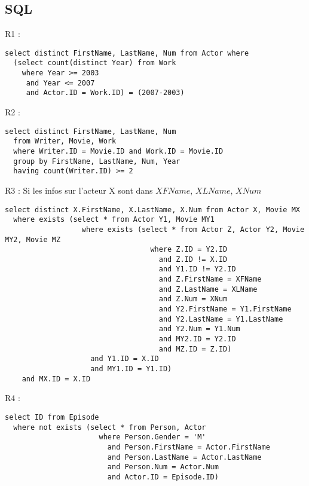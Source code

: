 \documentclass[a4paper,12pt]{article}
\begin{document}
\subsection{SQL}
\begin{list}{-}{}
  \item R1 :
    \begin{lstlisting}
select distinct FirstName, LastName, Num from Actor where
  (select count(distinct Year) from Work
    where Year >= 2003
     and Year <= 2007
     and Actor.ID = Work.ID) = (2007-2003)
    \end{lstlisting}
  \item R2 :
    \begin{lstlisting}
select distinct FirstName, LastName, Num
  from Writer, Movie, Work
  where Writer.ID = Movie.ID and Work.ID = Movie.ID
  group by FirstName, LastName, Num, Year
  having count(Writer.ID) >= 2
    \end{lstlisting}
  \item R3 :
    Si les infos sur l'acteur X sont dans $XFName$, $XLName$, $XNum$
    \begin{lstlisting}
select distinct X.FirstName, X.LastName, X.Num from Actor X, Movie MX
  where exists (select * from Actor Y1, Movie MY1
                  where exists (select * from Actor Z, Actor Y2, Movie MY2, Movie MZ
                                  where Z.ID = Y2.ID
                                    and Z.ID != X.ID
                                    and Y1.ID != Y2.ID
                                    and Z.FirstName = XFName
                                    and Z.LastName = XLName
                                    and Z.Num = XNum
                                    and Y2.FirstName = Y1.FirstName
                                    and Y2.LastName = Y1.LastName
                                    and Y2.Num = Y1.Num
                                    and MY2.ID = Y2.ID
                                    and MZ.ID = Z.ID)
                    and Y1.ID = X.ID
                    and MY1.ID = Y1.ID)
    and MX.ID = X.ID
    \end{lstlisting}
  \item R4 :
    \begin{lstlisting}
select ID from Episode
  where not exists (select * from Person, Actor
                      where Person.Gender = 'M'
                        and Person.FirstName = Actor.FirstName
                        and Person.LastName = Actor.LastName
                        and Person.Num = Actor.Num
                        and Actor.ID = Episode.ID)

\end{lstlisting}
\end{list}
\end{document}
